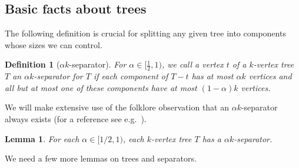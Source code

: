 \documentclass[12pt]{article}
\newtheorem{lemma}[theorem]{Lemma}
\newtheorem{corollary}[theorem]{Corollary}
\newtheorem{definition}[theorem]{Definition}
\begin{document}
\subsection{Basic facts about  trees}

\iffalse
\begin{lemma}\label{diffsidesT}
If a tree $T$ with bipartition classes $A$, $B$, and $|A|\ge |B|$ then $A$ contains more than $|A|-|B|$ leaves of $T$.
\end{lemma}
\begin{proof} 
Since $T$ is a tree,   $|E(T)|=|A|+|B|-1$, and this is also the sum of the degrees of the vertices in $A$. Each nonleaf of $A$ has degree at least two, and so, $|E(T)|\ge 2|A-L|+|L|= 2|A|-|L|$ where $L$ is the set of all leaves   of $T$ contained in $A$. Hence $|L|\ge |A|-|B|+1$, as desired.
\end{proof}

The following is an immediate corollary of the previous lemma.
\begin{corollary}\label{leaf}
If a tree $T$ has bipartition classes $A$, $B$ with $|A|\ge |B|$ then $A$ contains a leaf of $T$.
\end{corollary}

\fi

The following definition is crucial for splitting any given tree into components whose sizes we can control.
\begin{definition}[$\alpha k$-separator]\label{sepa}
For $\alpha\in [\frac 12,1)$, we call a vertex $t$ of a $k$-vertex tree $T$ an {\em $\alpha k$-separator} for $T$ if each component of $T-t$ has at most $\alpha k$ vertices and all but at most one of these components have at most $(1-\alpha) k$ vertices.
\end{definition}

We will make extensive use of the   folklore observation that an $\alpha k$-separator always exists    (for a reference see e.g.~\cite{HRSW20}).
\begin{lemma}\label{lem:sepa}
For each $\alpha\in [1/2,1)$, each $k$-vertex tree $T$ has a $\alpha k$-separator.
\end{lemma}



We need a few more  lemmas on trees and separators.
\end{document}
